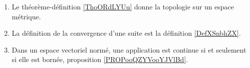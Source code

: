 \begin{enumerate}
    \item
        Le théorème-définition \ref{ThoORdLYUu} donne la topologie sur un espace métrique.
    \item
        La définition de la convergence d'une suite est la définition \ref{DefXSnbhZX}. 
    \item
        Dans un espace vectoriel normé, une application est continue si et seulement si elle est bornée, proposition \ref{PROPooQZYVooYJVlBd}.
\end{enumerate}

